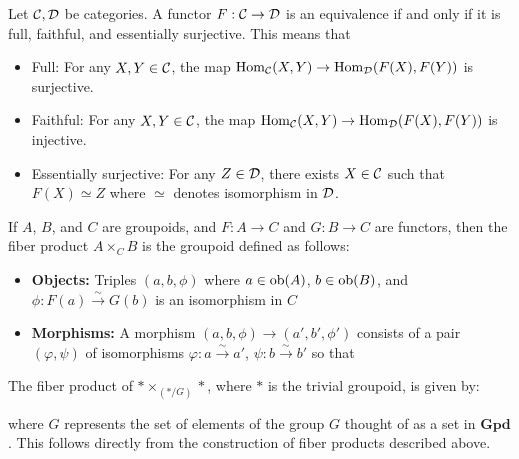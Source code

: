 \documentclass[12pt]{article}
\begin{document}
\begin{proposition}
    Let $\cal C, \cal D$ be categories. A functor $F: \cal C \to \cal D$ is an equivalence if and only if it is full, faithful, and essentially surjective. This means that \begin{itemize}
        \item Full: For any $X,Y \in \cal C$, the map $\operatorname{Hom}_{\cal C}(X,Y) \to \operatorname{Hom}_{\cal D}(F(X), F(Y))$ is surjective.
        \item Faithful: For any $X,Y \in \cal C$, the map $\operatorname{Hom}_{\cal C}(X,Y) \to \operatorname{Hom}_{\cal D}(F(X), F(Y))$ is injective.
        \item Essentially surjective: For any $Z \in \cal D$, there exists $X \in \cal C$ such that $F(X) \simeq Z$ where $\simeq$ denotes isomorphism in $\cal D$.
    \end{itemize}
\end{proposition}

\begin{definition}
    If $A$, $B$, and $C$ are groupoids, and $F : A \rightarrow C$ and $G : B \rightarrow C$ are functors, then the fiber product $A \times_C B$ is the groupoid defined as follows:

    \begin{itemize}
        \item \textbf{Objects:} Triples $(a, b, \phi)$ where $a \in \operatorname{ob}(A)$, $b \in \operatorname{ob}(B)$, and $\phi : F(a) \stackrel{\sim}{\rightarrow} G(b)$ is an isomorphism in $C$

        \item \textbf{Morphisms:} A morphism $(a, b, \phi) \rightarrow (a', b', \phi')$ consists of a pair $(\varphi, \psi)$ of isomorphisms $\varphi : a \stackrel{\sim}{\rightarrow} a'$, $\psi : b \stackrel{\sim}{\rightarrow} b'$ so that
              \begin{center}
              \end{center}
    \end{itemize}
\end{definition}

\begin{example}
    The fiber product of $* \times_{(*/G)} *$, where $*$ is the trivial groupoid, is given by:
    \begin{center}
    \end{center}
    where $G$ represents the set of elements of the group $G$ thought of as a set in $\textbf{Gpd}$. This follows directly from the construction of fiber products described above.
\end{example}
\end{document}
